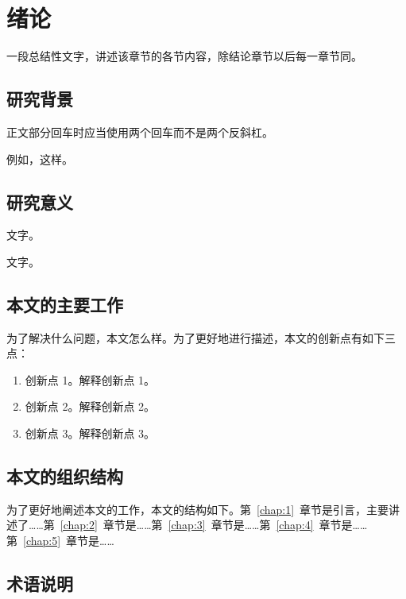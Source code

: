 \documentclass[14pt]{jnuthesis}
\begin{document}

\tableofcontents

\chapter{绪论}\setcounter{page}{1} %
\label{chap:1}

一段总结性文字，讲述该章节的各节内容，除结论章节以后每一章节同。

\section{研究背景}

正文部分回车时应当使用两个回车而不是两个反斜杠。

例如，这样。

\section{研究意义}

文字。

文字。

\section{本文的主要工作}


为了解决什么问题，本文怎么样。为了更好地进行描述，本文的创新点有如下三点：

\begin{enumerate}[1）]
	\item 创新点 1。解释创新点 1。
	\item 创新点 2。解释创新点 2。
	\item 创新点 3。解释创新点 3。
\end{enumerate}

\section{本文的组织结构}

为了更好地阐述本文的工作，本文的结构如下。第~\ref{chap:1}~章节是引言，主要讲述了……第~\ref{chap:2}~章节是……第~\ref{chap:3}~章节是……第~\ref{chap:4}~章节是……第~\ref{chap:5}~章节是……


\section{术语说明}
\end{document}
